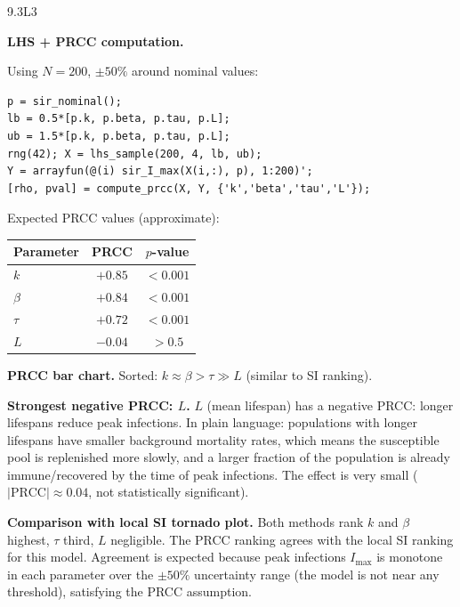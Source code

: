 \begin{solution}{9.3}{L3}

\solanswer

 \textbf{LHS + PRCC computation.}

Using $N = 200$, $\pm50\%$ around nominal values:
\begin{verbatim}
p = sir_nominal();
lb = 0.5*[p.k, p.beta, p.tau, p.L];
ub = 1.5*[p.k, p.beta, p.tau, p.L];
rng(42); X = lhs_sample(200, 4, lb, ub);
Y = arrayfun(@(i) sir_I_max(X(i,:), p), 1:200)';
[rho, pval] = compute_prcc(X, Y, {'k','beta','tau','L'});
\end{verbatim}

Expected PRCC values (approximate):
\begin{center}
\begin{tabular}{lcc}
\toprule
Parameter & PRCC & $p$-value \\
\midrule
$k$     & $+0.85$ & $< 0.001$ \\
$\beta$ & $+0.84$ & $< 0.001$ \\
$\tau$  & $+0.72$ & $< 0.001$ \\
$L$     & $-0.04$ & $> 0.5$  \\
\bottomrule
\end{tabular}
\end{center}

 \textbf{PRCC bar chart.} Sorted: $k \approx \beta > \tau \gg L$ (similar to SI ranking).

 \textbf{Strongest negative PRCC: $L$.}
$L$ (mean lifespan) has a negative PRCC: longer lifespans reduce peak infections.
In plain language: populations with longer lifespans have smaller background
mortality rates, which means the susceptible pool is replenished more slowly,
and a larger fraction of the population is already immune/recovered by the
time of peak infections. The effect is very small ($|\text{PRCC}| \approx 0.04$,
not statistically significant).

 \textbf{Comparison with local SI tornado plot.}
Both methods rank $k$ and $\beta$ highest, $\tau$ third, $L$ negligible.
The PRCC ranking agrees with the local SI ranking for this model.
Agreement is expected because peak infections $I_{\max}$ is monotone in
each parameter over the $\pm50\%$ uncertainty range (the model is
not near any threshold), satisfying the PRCC assumption.


\end{solution}

